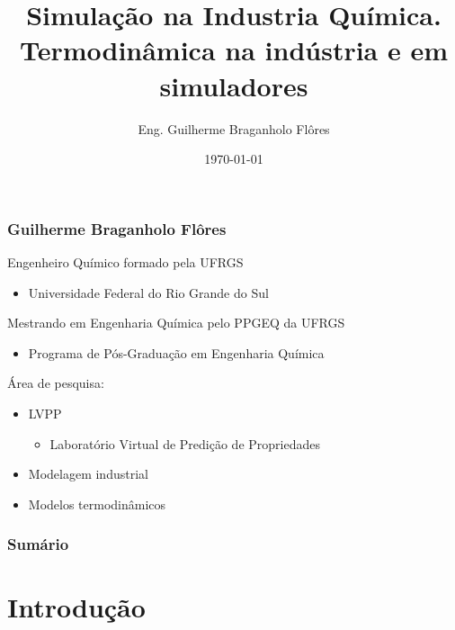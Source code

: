 \documentclass[aspectratio=169]{beamer}
\title[Simulação na Industria Química]{Simulação na Industria Química.\\
Termodinâmica na indústria e em simuladores }
\author{Eng. Guilherme Braganholo Flôres} %
\institute[PPGEQ - UFRGS] %
{
UNIVERSIDADE FEDERAL DO RIO GRANDE DO SUL \\
ESCOLA DE ENGENHARIA \\
DEPARTAMENTO DE ENGENHARIA QUÍMICA \\
LAB. VIRTUAL DE PREDIÇÃO DE PROPRIEDADE \\ %
\medskip
\textit{gbflores89@gmail.com} %
}
\date{\today} %
\begin{document}
\begin{frame}
\titlepage %
\end{frame}

\begin{frame}
	\frametitle{Guilherme Braganholo Flôres}
	Engenheiro Químico formado pela UFRGS
	\begin{itemize} 
		\item Universidade Federal do Rio Grande do Sul
	\end{itemize}

	Mestrando em Engenharia Química pelo PPGEQ da UFRGS
	\begin{itemize}
		\item Programa de Pós-Graduação em Engenharia Química
	\end{itemize}
 
	Área de pesquisa:
	\begin{itemize}
		\item LVPP
		\begin{itemize}
			\item Laboratório Virtual de Predição de Propriedades
		\end{itemize}
	\item Modelagem industrial 
	\item Modelos termodinâmicos
	\end{itemize}
\end{frame}


\begin{frame}
\frametitle{Sumário} %
\tableofcontents %
\end{frame}


\section{Introdução}
\end{document}

